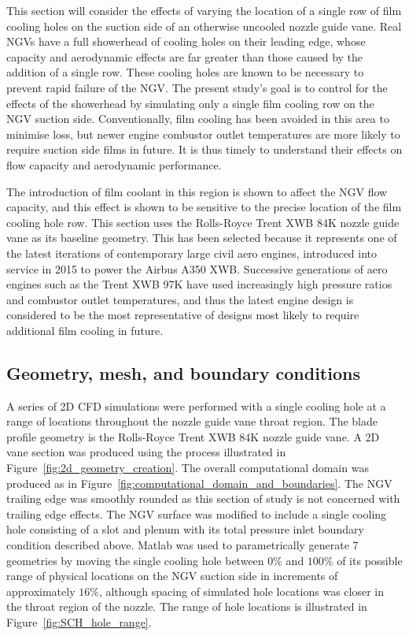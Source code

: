 \documentclass[a4paper, 11pt, oneside]{report}
\begin{document}
This section will consider the effects of varying the location of a single row of film cooling holes on the suction side of an otherwise uncooled nozzle guide vane. Real NGVs have a full showerhead of cooling holes on their leading edge, whose capacity and aerodynamic effects are far greater than those caused by the addition of a single row. These cooling holes are known to be necessary to prevent rapid failure of the NGV. The present study's goal is to control for the effects of the showerhead by simulating only a single film cooling row on the NGV suction side. Conventionally, film cooling has been avoided in this area to minimise loss, but newer engine combustor outlet temperatures are more likely to require suction side films in future. It is thus timely to understand their effects on flow capacity and aerodynamic performance. 

The introduction of film coolant in this region is shown to affect the NGV flow capacity, and this effect is shown to be sensitive to the precise location of the film cooling hole row. This section uses the Rolls-Royce Trent XWB 84K nozzle guide vane as its baseline geometry. This has been selected because it represents one of the latest iterations of contemporary large civil aero engines, introduced into service in 2015 to power the Airbus A350 XWB. Successive generations of aero engines such as the Trent XWB 97K have used increasingly high pressure ratios and combustor outlet temperatures, and thus the latest engine design is considered to be the most representative of designs most likely to require additional film cooling in future.

\subsection{Geometry, mesh, and boundary conditions}

A series of 2D CFD simulations were performed with a single cooling hole at a range of locations throughout the nozzle guide vane throat region. The blade profile geometry is the Rolls-Royce Trent XWB 84K nozzle guide vane. A 2D vane section was produced using the process illustrated in Figure~\ref{fig:2d_geometry_creation}. The overall computational domain was produced as in Figure~\ref{fig:computational_domain_and_boundaries}. The NGV trailing edge was smoothly rounded as this section of study is not concerned with trailing edge effects. The NGV surface was modified to include a single cooling hole consisting of a slot and plenum with its total pressure inlet boundary condition described above. Matlab was used to parametrically generate 7 geometries by moving the single cooling hole between $0\%$ and $100\%$ of its possible range of physical locations on the NGV suction side in increments of approximately $16\%$, although spacing of simulated hole locations was closer in the throat region of the nozzle. The range of hole locations is illustrated in Figure~\ref{fig:SCH_hole_range}.
\end{document}
